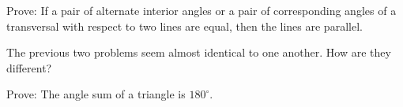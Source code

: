 \documentclass[nooutcomes]{ximera}
\begin{document}
\begin{problem}
Prove: If a pair of alternate interior angles or a pair of corresponding angles of a transversal with respect to two lines are equal, then the lines are parallel.
\end{problem}

\begin{problem}
The previous two problems seem almost identical to one another.  How are they different?  
\end{problem}

\begin{problem}
Prove:  The angle sum of a triangle is $180^\circ$.
\end{problem}
\end{document}
